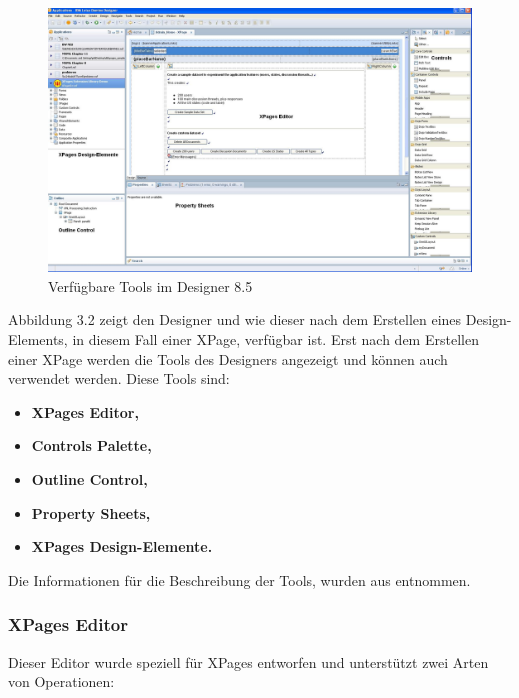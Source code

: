 \begin{figure}[H]
    \centerline{\includegraphics[scale=0.35]{pics/xpageseditor}}
    \caption[XPages Editor]{\label{FiG:XPages Editor}
	Verfügbare Tools im Designer 8.5}
\end{figure}
Abbildung 3.2 zeigt den Designer und wie dieser nach dem Erstellen eines Design-Elements, in diesem Fall einer XPage, verfügbar ist. 
Erst nach dem Erstellen einer XPage werden die Tools des Designers angezeigt und können auch verwendet werden.\newline
\newline Diese Tools sind:


\begin{itemize}
\item \textbf{XPages Editor,}
\item \textbf{Controls Palette,} 
\item \textbf{Outline Control,}
\item \textbf{Property Sheets,}
\item \textbf{XPages Design-Elemente.}
\end{itemize}
Die Informationen für die Beschreibung der Tools, wurden aus \cite{donelly} entnommen. 

\subsubsection{XPages Editor}
\label{sec:4designelemente}

Dieser Editor wurde speziell für XPages entworfen und unterstützt zwei Arten von Operationen:

